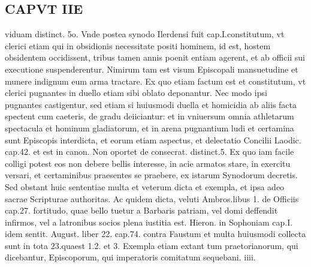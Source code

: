 \documentclass{article}
\begin{document}
\begin{pages}
\section*{CAPVT  IIE }
\marginpar{[ p.135 ]}\pstart viduam distinct. 5o. Vnde postea synodo Ilerdensi fuit cap.I.constitutum, vt clerici etiam qui in obsidionis necessitate positi hominem, id est, hostem obsidentem occidissent, tribus tamen annis poenit entiam agerent, et ab officii sui executione suspenderentur. Nimirum tam est visum Episcopali mansuetudine et munere indignum eum arma tractare. Ex quo etiam factum est et constitutum, vt clerici pugnantes in duello etiam sibi oblato deponantur. Nec modo ipsi pugnantes castigentur, sed etiam si huiusmodi duella et homicidia ab aliis facta spectent cum caeteris, de gradu deiiciantur: et in vniuersum omnia athletarum spectacula et hominum gladiatorum, et in arena pugnantium ludi et certamina sunt Episcopis interdicta, et eorum etiam aspectus, et delectatio Concilii Laodic. cap.42. et est in canon. Non oportet de consecrat. distinct.5. Ex quo iam facile colligi potest eos non debere bellis interesse, in acie armatos stare, in exercitu versari, et certaminibus praesentes se praebere, ex istarum Synodorum decretis.  \pend\pstart Sed obstant huic sententiae multa et veterum dicta et exempla, et ipsa adeo sacrae Scripturae authoritas. Ac quidem dicta, veluti Ambros.libus  1. de Officiis cap.27. fortitudo, quae bello tuetur a Barbaris patriam, vel domi deffendit infirmos, vel a latronibus socios plena iustitia est. Hieron. in Sophoniam cap.I. idem sentit. August. liber  22. cap.74. contra Faustum et multa huiusmodi collecta sunt in tota 23.quaest 1.2. et 3. Exempla etiam extant tum praetorianorum, qui dicebantur, Episcoporum, qui imperatoris comitatum sequebani. iiii.  \pend

\end{pages}
\end{document}
